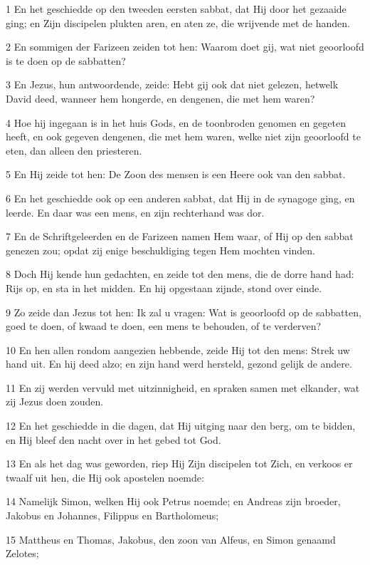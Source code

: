 \par 1 En het geschiedde op den tweeden eersten sabbat, dat Hij door het gezaaide ging; en Zijn discipelen plukten aren, en aten ze, die wrijvende met de handen.
\par 2 En sommigen der Farizeen zeiden tot hen: Waarom doet gij, wat niet geoorloofd is te doen op de sabbatten?
\par 3 En Jezus, hun antwoordende, zeide: Hebt gij ook dat niet gelezen, hetwelk David deed, wanneer hem hongerde, en dengenen, die met hem waren?
\par 4 Hoe hij ingegaan is in het huis Gods, en de toonbroden genomen en gegeten heeft, en ook gegeven dengenen, die met hem waren, welke niet zijn geoorloofd te eten, dan alleen den priesteren.
\par 5 En Hij zeide tot hen: De Zoon des mensen is een Heere ook van den sabbat.
\par 6 En het geschiedde ook op een anderen sabbat, dat Hij in de synagoge ging, en leerde. En daar was een mens, en zijn rechterhand was dor.
\par 7 En de Schriftgeleerden en de Farizeen namen Hem waar, of Hij op den sabbat genezen zou; opdat zij enige beschuldiging tegen Hem mochten vinden.
\par 8 Doch Hij kende hun gedachten, en zeide tot den mens, die de dorre hand had: Rijs op, en sta in het midden. En hij opgestaan zijnde, stond over einde.
\par 9 Zo zeide dan Jezus tot hen: Ik zal u vragen: Wat is geoorloofd op de sabbatten, goed te doen, of kwaad te doen, een mens te behouden, of te verderven?
\par 10 En hen allen rondom aangezien hebbende, zeide Hij tot den mens: Strek uw hand uit. En hij deed alzo; en zijn hand werd hersteld, gezond gelijk de andere.
\par 11 En zij werden vervuld met uitzinnigheid, en spraken samen met elkander, wat zij Jezus doen zouden.
\par 12 En het geschiedde in die dagen, dat Hij uitging naar den berg, om te bidden, en Hij bleef den nacht over in het gebed tot God.
\par 13 En als het dag was geworden, riep Hij Zijn discipelen tot Zich, en verkoos er twaalf uit hen, die Hij ook apostelen noemde:
\par 14 Namelijk Simon, welken Hij ook Petrus noemde; en Andreas zijn broeder, Jakobus en Johannes, Filippus en Bartholomeus;
\par 15 Mattheus en Thomas, Jakobus, den zoon van Alfeus, en Simon genaamd Zelotes;
